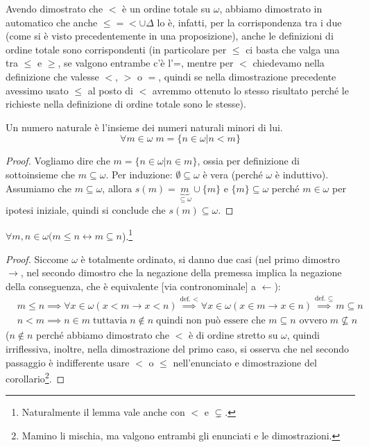 \documentclass[11pt]{scrartcl}
\begin{document}
\begin{remark}
	Avendo dimostrato che $<$ è un ordine totale su $\omega$, abbiamo dimostrato in automatico che anche $\leq = < \cup \Delta$ lo è, infatti, per la corrispondenza tra i due (come si è visto precedentemente in una proposizione), anche le definizioni di ordine totale sono corrispondenti (in particolare per 
	$\leq$ ci basta che valga una tra $\leq$ e $\geq$, se valgono entrambe c'è l'=, mentre per $<$ chiedevamo nella definizione che valesse $<$, $>$ o $=$, quindi se nella dimostrazione precedente avessimo usato $\leq$ al posto di $<$ avremmo ottenuto lo stesso risultato perché le richieste nella definizione di ordine totale sono le stesse).
\end{remark}

\begin{corollary}
	Un numero naturale è l'insieme dei numeri naturali minori di lui.
	\[ \forall m \in \omega \; m = \{n \in \omega | n < m\}
		\]
\end{corollary}

\begin{proof}
	Vogliamo dire che $m = \{ n \in \omega | n \in m\}$, ossia per definizione di sottoinsieme che $m \subseteq \omega$. Per induzione: $\emptyset \subseteq \omega$ è vera (perché $\omega$ è induttivo).
	Assumiamo che $m \subseteq \omega$, allora $s(m) = \underbrace{m}_{\subseteq \omega} \cup \{m\}$ e $\{m\} \subseteq \omega$ perché $m \in \omega$ per ipotesi iniziale, quindi si conclude che $s(m) \subseteq \omega$.
\end{proof}

\begin{corollary}[Più piccolo = contenuto]
	$\forall m,n \in \omega (m \leq n \leftrightarrow m \subseteq n$).\footnote{Naturalmente il lemma vale anche con $<$ e $\subsetneq$.}
\end{corollary}

\begin{proof}
	Siccome $\omega$ è totalmente ordinato, si danno due casi (nel primo dimostro $\rightarrow$, nel secondo dimostro che la negazione della premessa implica la negazione della conseguenza, che è equivalente [via contronominale] a $\leftarrow$):
	\begin{align*}
		& m \leq n \implies \forall x \in \omega (x < m \rightarrow x < n) \overset{\text{def. $<$}}{\implies} \forall x \in \omega (x \in m \rightarrow x \in n) \overset{\text{def. $\subseteq$}}{\implies} m \subseteq n \\
	    & n < m \implies n \in m \; \text{tuttavia} \; n \not\in n \; \text{quindi non può essere che $m \subseteq n$ ovvero} \; m \not\subseteq n
	\end{align*}
	($n \not \in n$ perché abbiamo dimostrato che $<$ è di ordine stretto su $\omega$, quindi irriflessiva, inoltre, nella dimostrazione del primo caso, si osserva che nel secondo passaggio è
	indifferente usare $<$ o $\leq$ nell'enunciato e dimostrazione del corollario\footnote{Mamino li mischia, ma valgono entrambi gli enunciati e le dimostrazioni.}.
\end{proof}
\pagebreak
\end{document}
